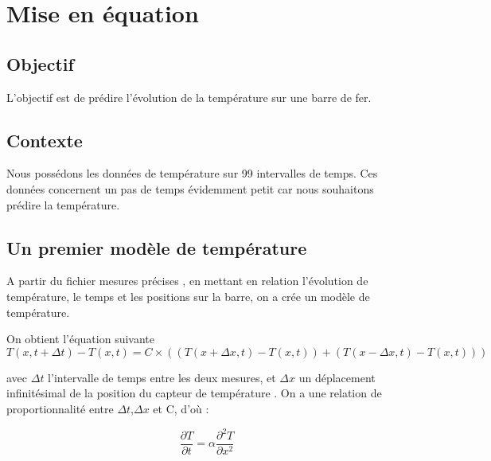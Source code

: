  




\maketitle
\tableofcontents

\newpage
\chapter{Mise en équation}

\section{Objectif}

L'objectif est de prédire l'évolution de la température sur une barre de fer. 

\section{Contexte}

Nous possédons les données de température sur 99 intervalles de temps. Ces données concernent un pas de temps évidemment petit car nous souhaitons prédire la température.

\section{Un premier modèle de température}

A partir du fichier mesures précises ,
en mettant en relation l'évolution de température, le temps et les positions sur la barre, on a crée un modèle de température.


On obtient l'équation suivante
$$
T(x, t+\Delta t) - T(x,t) = C \times ( (T(x+\Delta x, t)-T(x,t)) + (T(x-\Delta x,t)-T(x,t)))
$$

avec \( \Delta t \) l'intervalle de temps entre les deux mesures,
et \( \Delta x \) un déplacement infinitésimal de la position du capteur de température . \newline
\newpage
On a une relation de proportionnalité entre  \( \Delta t \),\( \Delta x \) et C, d'où :

$$
\frac{\partial T}{\partial t} = \alpha \frac{\partial^2 T}{\partial x^2}
$$


